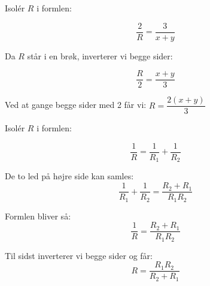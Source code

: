 \begin{example} Isolér \(R\) i formlen:

\[
\frac{2}{R} = \frac{3}{x + y}
\]

\begin{solution} Da \(R\) står i en brøk, inverterer vi begge sider:

\[
\frac{R}{2} = \frac{x + y}{3}
\]

Ved at gange begge sider med 2 får vi: $R = \dfrac{2(x + y)}{3}$    
\end{solution}
    
\end{example} 

\begin{example} Isolér \(R\) i formlen:

\[
\frac{1}{R} = \frac{1}{R_1} + \frac{1}{R_2}
\]
\begin{solution}
De to led på højre side kan samles:
\[
\frac{1}{R_1} + \frac{1}{R_2} = \frac{R_2 + R_1}{R_1R_2}
\]

Formlen bliver så:
\[
\frac{1}{R} = \frac{R_2 + R_1}{R_1R_2}
\]

Til sidst inverterer vi begge sider og får:
\[
R = \frac{R_1R_2}{R_2 + R_1}
\]

\end{solution}
\end{example}
